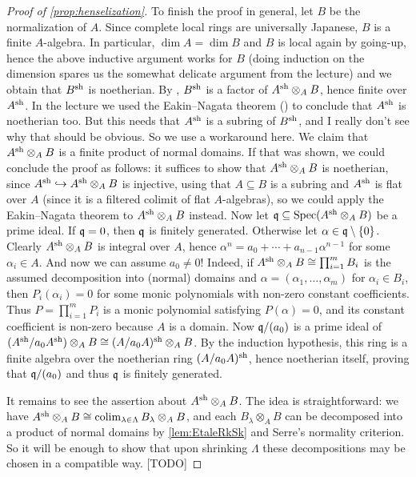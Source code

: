 \documentclass[a4paper, 10pt, oneside, DIV=9, chapterprefix=true, numbers=enddot, bibliography=totoc]{scrbook}
\begin{document}
\begin{proof}[Proof of \cref{prop:henselization}]
	To finish the proof in general, let $B$ be the normalization of $A$. Since complete local rings are universally Japanese, $B$ is a finite $A$-algebra. In particular, $\dim A=\dim B$ and $B$ is local again by going-up, hence the above inductive argument works for $B$ (doing induction on the dimension spares us the somewhat delicate argument from the lecture) and we obtain that $B^{\mathrm{sh}}$ is noetherian. By , $B^{\mathrm{sh}}$ is a factor of $A^{\mathrm{sh}}\otimes_AB$, hence finite over $A^{\mathrm{sh}}$. In the lecture we used the Eakin--Nagata theorem (\cite[Theorem~3.7]{matsumuraCRT}) to conclude that $A^{\mathrm{sh}}$ is noetherian too. But this needs that $A^{\mathrm{sh}}$ is a subring of $B^{\mathrm{sh}}$, and I really don't see why that should be obvious. So we use a workaround here. We claim that $A^{\mathrm{sh}}\otimes_AB$ is a finite product of normal domains. If that was shown, we could conclude the proof as follows: it suffices to show that $A^{\mathrm{sh}}\otimes_AB$ is noetherian, since $A^\sh\monomorphism A^\sh\otimes_AB$ is injective, using that $A\subseteq B$ is a subring and $A^{\mathrm{sh}}$ is flat over $A$ (since it is a filtered colimit of flat $A$-algebras), so we could apply the Eakin--Nagata theorem to $A^{\mathrm{sh}}\otimes_AB$ instead. Now let $\mathfrak{q}\subseteq \operatorname{Spec} (A^{\mathrm{sh}}\otimes_AB)$ be a prime ideal. If $\mathfrak{q}=0$, then $\mathfrak{q}$ is finitely generated. Otherwise let $\alpha\in \mathfrak{q}\setminus\{0\}$. Clearly $A^{\mathrm{sh}}\otimes_AB$ is integral over $A$, hence $\alpha^n=a_0+\dotsb+a_{n-1}\alpha^{n-1}$ for some $\alpha_i\in A$. And now we can assume $a_0\neq 0$! Indeed, if $A^{\mathrm{sh}}\otimes_AB\cong \prod_{i=1}^mB_i$ is the assumed decomposition into (normal) domains and $\alpha=(\alpha_1,\dotsc,\alpha_m)$ for $\alpha_i\in B_i$, then $P_i(\alpha_i)=0$ for some monic polynomials with non-zero constant coefficients. Thus $P=\prod_{i=1}^mP_i$ is a monic polynomial satisfying $P(\alpha)=0$, and its constant coefficient is non-zero because $A$ is a domain. Now $\mathfrak{q}/(a_0)$ is a prime ideal of $(A^{\mathrm{sh}}/a_0A^{\mathrm{sh}})\otimes_AB\cong (A/a_0A)^{\mathrm{sh}}\otimes_AB$. By the induction hypothesis, this ring is a finite algebra over the noetherian ring $(A/a_0A)^{\mathrm{sh}}$, hence noetherian itself, proving that $\mathfrak{q}/(a_0)$ and thus $\mathfrak{q}$ is finitely generated.
	
	It remains to see the assertion about $A^{\mathrm{sh}}\otimes_AB$. The idea is straightforward: we have $A^{\mathrm{sh}}\otimes_AB\cong \operatorname*{colim}_{\lambda\in\Lambda} B_\lambda\otimes_AB$, and each $B_\lambda\otimes_AB$ can be decomposed into a product of normal domains by \cref{lem:EtaleRkSk} and Serre's normality criterion. So it will be enough to show that upon shrinking $\Lambda$ these decompositions may be chosen in a compatible way. [TODO]
	

\end{proof}
\end{document}
